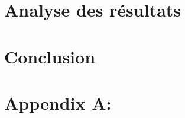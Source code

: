 \documentclass[11pt]{article}
\begin{document}
\cleardoublepage


\section{Analyse des résultats}


\subsection{}


\subsection{}

\cleardoublepage


\section{Conclusion}

\cleardoublepage


\cleardoublepage




\cleardoublepage


\section*{Appendix A:}

\cleardoublepage
\end{document}

